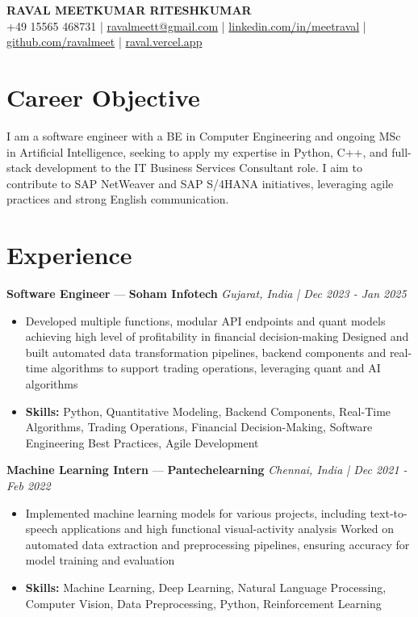 \documentclass[a4paper,10pt]{article}
\begin{document}
\begin{center}
  {\Large\bfseries RAVAL MEETKUMAR RITESHKUMAR}\\[2pt]
  {\small +49 15565 468731 \;|\; \href{mailto:ravalmeett@gmail.com}{ravalmeett@gmail.com} \;|\; \href{https://www.linkedin.com/in/meetraval/}{linkedin.com/in/meetraval} \;|\; \href{https://github.com/ravalmeet}{github.com/ravalmeet} \;|\; \href{https://raval.vercel.app/}{raval.vercel.app}}
\end{center}
\vspace{-3pt}

\section*{Career Objective}
I am a software engineer with a BE in Computer Engineering and ongoing MSc in Artificial Intelligence, seeking to apply my expertise in Python, C++, and full-stack development to the IT Business Services Consultant role. I aim to contribute to SAP NetWeaver and SAP S/4HANA initiatives, leveraging agile practices and strong English communication.\par

\section*{Experience}
\textbf{Software Engineer} — \textbf{Soham Infotech} \hfill \textit{Gujarat, India \;|\; Dec 2023 - Jan 2025}\par
\vspace{1pt}
\begin{itemize}
  \item Developed multiple functions, modular API endpoints and quant models achieving high level of profitability in financial decision-making Designed and built automated data transformation pipelines, backend components and real-time algorithms to support trading operations, leveraging quant and AI algorithms
  \item \textbf{Skills:} Python, Quantitative Modeling, Backend Components, Real-Time Algorithms, Trading Operations, Financial Decision-Making, Software Engineering Best Practices, Agile Development
\end{itemize}
\vspace{3pt}
\textbf{Machine Learning Intern} — \textbf{Pantechelearning} \hfill \textit{Chennai, India \;|\; Dec 2021 - Feb 2022}\par
\vspace{1pt}
\begin{itemize}
  \item Implemented machine learning models for various projects, including text-to-speech applications and high functional visual-activity analysis Worked on automated data extraction and preprocessing pipelines, ensuring accuracy for model training and evaluation
  \item \textbf{Skills:} Machine Learning, Deep Learning, Natural Language Processing, Computer Vision, Data Preprocessing, Python, Reinforcement Learning
\end{itemize}
\end{document}
